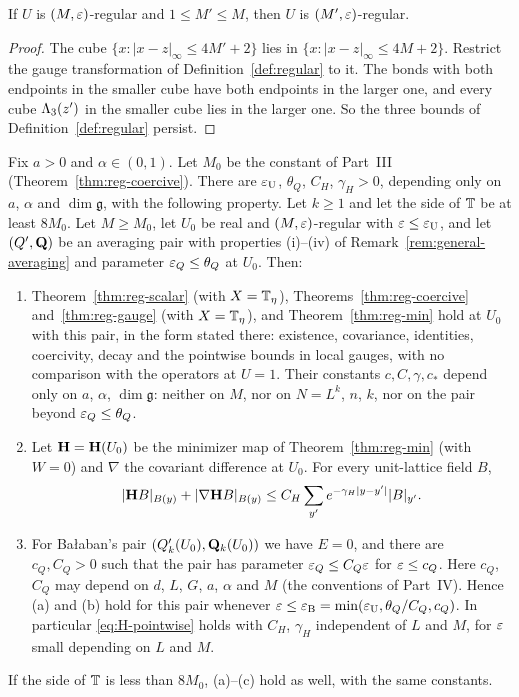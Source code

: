 \begin{lemma}\label{lem:regular-monotone}
If $U$ is $(M,\varepsilon)$-regular and $1\le M'\le M$, then $U$ is $(M',\varepsilon)$-regular.
\end{lemma}

\begin{proof}
The cube $\{x:|x-z|_\infty\le4M'+2\}$ lies in $\{x:|x-z|_\infty\le4M+2\}$. Restrict the gauge transformation of Definition~\ref{def:regular} to it. The bonds with both endpoints in the smaller cube have both endpoints in the larger one, and every cube $\Lambda_3(z')$ in the smaller cube lies in the larger one. So the three bounds of Definition~\ref{def:regular} persist.
\end{proof}

\begin{lemma}\label{lem:uniformity}
Fix $a>0$ and $\alpha\in(0,1)$. Let $M_0$ be the constant of Part~III (Theorem~\ref{thm:reg-coercive}). There are $\varepsilon_{\rm U}$, $\theta_Q$, $C_H$, $\gamma_H>0$, depending only on $a$, $\alpha$ and $\dim\mathfrak g$, with the following property. Let $k\ge1$ and let the side of $\mathbb T$ be at least $8M_0$. Let $M\ge M_0$, let $U_0$ be real and $(M,\varepsilon)$-regular with $\varepsilon\le\varepsilon_{\rm U}$, and let $(Q',\mathbf Q)$ be an averaging pair with properties (i)--(iv) of Remark~\ref{rem:general-averaging} and parameter $\varepsilon_Q\le\theta_Q$ at $U_0$. Then:
\begin{enumerate}[label=(\alph*)]
\item Theorem~\ref{thm:reg-scalar} (with $X=\mathbb T_\eta$), Theorems~\ref{thm:reg-coercive} and~\ref{thm:reg-gauge} (with $X=\mathbb T_\eta$), and Theorem~\ref{thm:reg-min} hold at $U_0$ with this pair, in the form stated there: existence, covariance, identities, coercivity, decay and the pointwise bounds in local gauges, with no comparison with the operators at $U=1$. Their constants $c,C,\gamma,c_*$ depend only on $a$, $\alpha$, $\dim\mathfrak g$: neither on $M$, nor on $N=L^k$, $n$, $k$, nor on the pair beyond $\varepsilon_Q\le\theta_Q$.
\item Let $\mathbf H=\mathbf H(U_0)$ be the minimizer map of Theorem~\ref{thm:reg-min} (with $W=0$) and $\nabla$ the covariant difference at $U_0$. For every unit-lattice field $B$,
\begin{equation}\label{eq:H-pointwise}
|\mathbf H B|_{B(y)}+|\nabla\mathbf H B|_{B(y)}\le C_H\sum_{y'}e^{-\gamma_H|y-y'|}|B|_{y'} .
\end{equation}
\item For Ba\l aban's pair $(Q'_k(U_0),\mathbf Q_k(U_0))$ we have $E=0$, and there are $c_Q,C_Q>0$ such that the pair has parameter $\varepsilon_Q\le C_Q\varepsilon$ for $\varepsilon\le c_Q$. Here $c_Q$, $C_Q$ may depend on $d$, $L$, $G$, $a$, $\alpha$ and $M$ (the conventions of Part~IV). Hence (a) and (b) hold for this pair whenever $\varepsilon\le\varepsilon_{\rm B}=\min(\varepsilon_{\rm U},\theta_Q/C_Q,c_Q)$. In particular \eqref{eq:H-pointwise} holds with $C_H$, $\gamma_H$ independent of $L$ and $M$, for $\varepsilon$ small depending on $L$ and $M$.
\end{enumerate}
If the side of $\mathbb T$ is less than $8M_0$, (a)--(c) hold as well, with the same constants.
\end{lemma}

